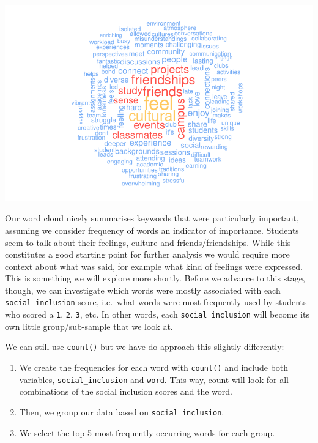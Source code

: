 \documentclass[
  letterpaper,
]{krantz}
\begin{document}
\includegraphics{14_mixed_methods_files/figure-pdf/wordcloud-plain-1.pdf}

Our word cloud nicely summarises keywords that were particularly
important, assuming we consider frequency of words an indicator of
importance. Students seem to talk about their feelings, culture and
friends/friendships. While this constitutes a good starting point for
further analysis we would require more context about what was said, for
example what kind of feelings were expressed. This is something we will
explore more shortly. Before we advance to this stage, though, we can
investigate which words were mostly associated with each
\texttt{social\_inclusion} score, i.e.~what words were most frequently
used by students who scored a \texttt{1}, \texttt{2}, \texttt{3}, etc.
In other words, each \texttt{social\_inclusion} will become its own
little group/sub-sample that we look at.

We can still use \texttt{count()} but we have do approach this slightly
differently:

\begin{enumerate}
\def\labelenumi{\arabic{enumi}.}
\item
  We create the frequencies for each word with \texttt{count()} and
  include both variables, \texttt{social\_inclusion} and \texttt{word}.
  This way, count will look for all combinations of the social inclusion
  scores and the word.
\item
  Then, we group our data based on \texttt{social\_inclusion}.
\item
  We select the top 5 most frequently occurring words for each group.
\end{enumerate}
\end{document}
